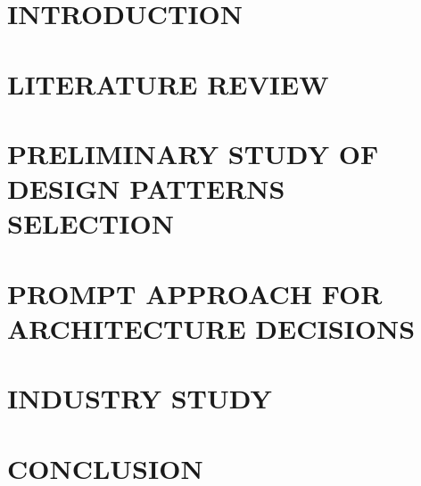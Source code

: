 
\chapter{INTRODUCTION}\label{ch:introduction} 


\chapter{LITERATURE REVIEW}\label{ch:literature-review} 


\chapter{PRELIMINARY STUDY OF DESIGN PATTERNS SELECTION}\label{ch:preliminar-study}


\chapter{PROMPT APPROACH FOR ARCHITECTURE DECISIONS}\label{ch:prompt-patterns}


\chapter{INDUSTRY STUDY}\label{ch:industry-use-cases}


\chapter{CONCLUSION}\label{ch:conclusion}

